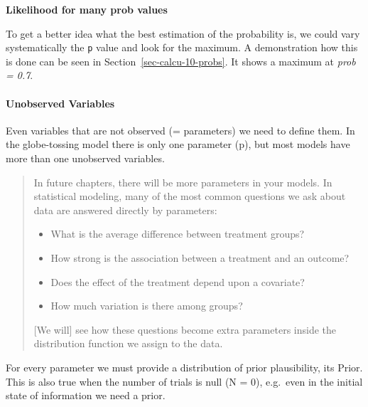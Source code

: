 \documentclass[
  letterpaper,
  DIV=11,
  numbers=noendperiod]{scrreprt}
\let\oldparagraph\paragraph
\renewcommand{\paragraph}[1]{\oldparagraph{#1}\mbox{}}
\providecommand{\tightlist}{%
  \setlength{\itemsep}{0pt}\setlength{\parskip}{0pt}}\usepackage{longtable,booktabs,array}
\begin{document}
\textbf{Likelihood for many prob values}

To get a better idea what the best estimation of the probability is, we
could vary systematically the \texttt{p} value and look for the maximum.
A demonstration how this is done can be seen in
Section~\ref{sec-calcu-10-probs}. It shows a maximum at \emph{prob =
0.7}.

\hypertarget{unobserved-variables}{%
\paragraph{Unobserved Variables}\label{unobserved-variables}}

Even variables that are not observed (= parameters) we need to define
them. In the globe-tossing model there is only one parameter (p), but
most models have more than one unobserved variables.

\begin{quote}
In future chapters, there will be more parameters in your models. In
statistical modeling, many of the most common questions we ask about
data are answered directly by parameters:

\begin{itemize}
\tightlist
\item
  What is the average difference between treatment groups?
\item
  How strong is the association between a treatment and an outcome?
\item
  Does the effect of the treatment depend upon a covariate?
\item
  How much variation is there among groups?
\end{itemize}

{[}We will{]} see how these questions become extra parameters inside the
distribution function we assign to the data.
\end{quote}

\begin{tcolorbox}[enhanced jigsaw, colframe=quarto-callout-important-color-frame, colback=white, toprule=.15mm, breakable, arc=.35mm, bottomtitle=1mm, colbacktitle=quarto-callout-important-color!10!white, toptitle=1mm, titlerule=0mm, title=\textcolor{quarto-callout-important-color}{\faExclamation}\hspace{0.5em}{Parameter \& Prior}, leftrule=.75mm, opacityback=0, rightrule=.15mm, opacitybacktitle=0.6, bottomrule=.15mm, left=2mm, coltitle=black]

For every parameter we must provide a distribution of prior
plausibility, its Prior. This is also true when the number of trials is
null (N = 0), e.g.~even in the initial state of information we need a
prior.

\end{tcolorbox}
\end{document}
